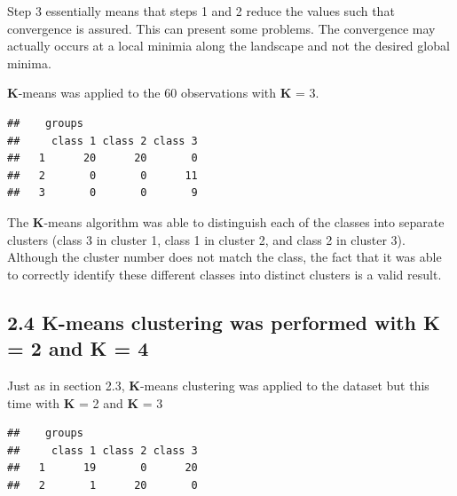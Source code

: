 \documentclass[]{article}
\newenvironment{Shaded}{\begin{snugshade}}{\end{snugshade}}
\newcommand{\KeywordTok}[1]{\textcolor[rgb]{0.13,0.29,0.53}{\textbf{{#1}}}}
\newcommand{\DataTypeTok}[1]{\textcolor[rgb]{0.13,0.29,0.53}{{#1}}}
\newcommand{\DecValTok}[1]{\textcolor[rgb]{0.00,0.00,0.81}{{#1}}}
\newcommand{\StringTok}[1]{\textcolor[rgb]{0.31,0.60,0.02}{{#1}}}
\newcommand{\NormalTok}[1]{{#1}}
\begin{document}
Step 3 essentially means that steps 1 and 2 reduce the values such that
convergence is assured. This can present some problems. The convergence
may actually occurs at a local minimia along the landscape and not the
desired global minima.

\textbf{K}-means was applied to the 60 observations with \textbf{K} = 3.

\begin{Shaded}
\end{Shaded}

\begin{verbatim}
##    groups
##     class 1 class 2 class 3
##   1      20      20       0
##   2       0       0      11
##   3       0       0       9
\end{verbatim}

The \textbf{K}-means algorithm was able to distinguish each of the
classes into separate clusters (class 3 in cluster 1, class 1 in cluster
2, and class 2 in cluster 3). Although the cluster number does not match
the class, the fact that it was able to correctly identify these
different classes into distinct clusters is a valid result.

\subsection{2.4 \textbf{K}-means clustering was performed with
\textbf{K} = 2 and \textbf{K} =
4}\label{k-means-clustering-was-performed-with-k-2-and-k-4}

Just as in section 2.3, \textbf{K}-means clustering was applied to the
dataset but this time with \textbf{K} = 2 and \textbf{K} = 3

\begin{Shaded}
\end{Shaded}

\begin{verbatim}
##    groups
##     class 1 class 2 class 3
##   1      19       0      20
##   2       1      20       0
\end{verbatim}
\end{document}
